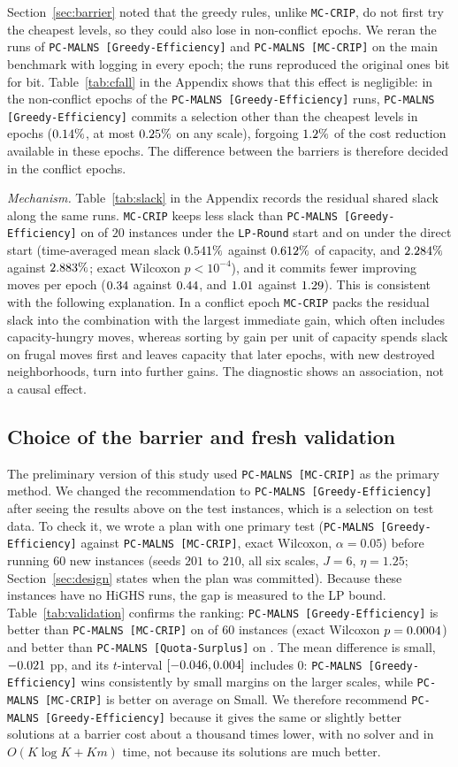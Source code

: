 \documentclass[a4paper,fleqn]{cas-sc}
\newcommand{\mcc}{\texttt{MC-CRIP}}
\newcommand{\pge}{\texttt{PC-MALNS [Greedy-Efficiency]}}
\newcommand{\pmc}{\texttt{PC-MALNS [MC-CRIP]}}
\newcommand{\pqs}{\texttt{PC-MALNS [Quota-Surplus]}}
\begin{document}
Section~\ref{sec:barrier} noted that the greedy rules, unlike \mcc, do not first try the cheapest levels, so they could also lose in non-conflict epochs. We reran the \CFAllRuns{} runs of \pge{} and \pmc{} on the main benchmark with logging in every epoch; the runs reproduced the original ones bit for bit. Table~\ref{tab:cfall} in the Appendix shows that this effect is negligible: in the \NCGEEpochs{} non-conflict epochs of the \pge{} runs, \pge{} commits a selection other than the cheapest levels in \NCGEDevNGE{} epochs ($0.14\%$, at most $0.25\%$ on any scale), forgoing $1.2\%$ of the cost reduction available in these epochs. The difference between the barriers is therefore decided in the conflict epochs.


\textit{Mechanism.} Table~\ref{tab:slack} in the Appendix records the residual shared slack along the same runs. \mcc{} keeps less slack than \pge{} on \SlackLPRSlackLessWins{} of $20$ instances under the \texttt{LP-Round} start and on \SlackDirectSlackLessWins{} under the direct start (time-averaged mean slack $0.541\%$ against $0.612\%$ of capacity, and $2.284\%$ against $2.883\%$; exact Wilcoxon $p < 10^{-4}$), and it commits fewer improving moves per epoch ($0.34$ against $0.44$, and $1.01$ against $1.29$). This is consistent with the following explanation. In a conflict epoch \mcc{} packs the residual slack into the combination with the largest immediate gain, which often includes capacity-hungry moves, whereas sorting by gain per unit of capacity spends slack on frugal moves first and leaves capacity that later epochs, with new destroyed neighborhoods, turn into further gains. The diagnostic shows an association, not a causal effect.


\subsection{Choice of the barrier and fresh validation}
\label{sec:validation}
The preliminary version of this study used \pmc{} as the primary method. We changed the recommendation to \pge{} after seeing the results above on the test instances, which is a selection on test data. To check it, we wrote a plan with one primary test (\pge{} against \pmc, exact Wilcoxon, $\alpha = 0.05$) before running $60$ new instances (seeds $201$ to $210$, all six scales, $J = 6$, $\eta = 1.25$; Section~\ref{sec:design} states when the plan was committed). Because these instances have no HiGHS runs, the gap is measured to the LP bound. Table~\ref{tab:validation} confirms the ranking: \pge{} is better than \pmc{} on \ValWinsMC{} of $60$ instances (exact Wilcoxon $p = 0.0004$) and better than \pqs{} on \ValWinsQS. The mean difference is small, $-0.021$ pp, and its $t$-interval $[-0.046, 0.004]$ includes $0$: \pge{} wins consistently by small margins on the larger scales, while \pmc{} is better on average on Small. We therefore recommend \pge{} because it gives the same or slightly better solutions at a barrier cost about a thousand times lower, with no solver and in $O(K \log K + Km)$ time, not because its solutions are much better.
\end{document}
